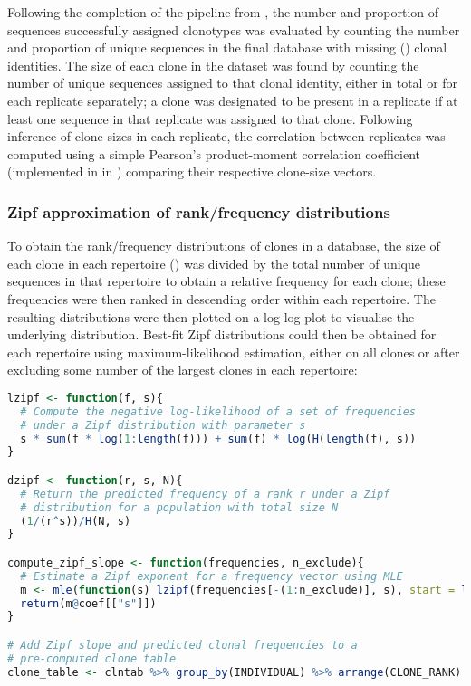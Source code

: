 Following the completion of the pipeline from , the number and proportion of sequences successfully assigned clonotypes was evaluated by counting the number and proportion of unique sequences in the final  database with missing () clonal identities. The size of each clone in the dataset was found by counting the number of unique sequences assigned to that clonal identity, either in total or for each replicate separately; a clone was designated to be present in a replicate if at least one sequence in that replicate was assigned to that clone. Following inference of clone sizes in each replicate, the correlation between replicates was computed using a simple Pearson's product-moment correlation coefficient (implemented in  in ) comparing their respective clone-size vectors.

\subsubsection{Zipf approximation of rank/frequency distributions}
\label{sec:methods_comp_igdownstream_zipf}

To obtain the rank/frequency distributions of clones in a  database, the size of each clone in each repertoire () was divided by the total number of unique sequences in that repertoire to obtain a relative frequency for each clone; these frequencies were then ranked in descending order within each repertoire. The resulting distributions were then plotted on a log-log plot to visualise the underlying distribution. Best-fit Zipf distributions could then be obtained for each repertoire using maximum-likelihood estimation, either on all clones or after excluding some number of the largest clones in each repertoire:

\begin{lstlisting}[language=R]
lzipf <- function(f, s){
  # Compute the negative log-likelihood of a set of frequencies
  # under a Zipf distribution with parameter s
  s * sum(f * log(1:length(f))) + sum(f) * log(H(length(f), s))
}

dzipf <- function(r, s, N){
  # Return the predicted frequency of a rank r under a Zipf 
  # distribution for a population with total size N
  (1/(r^s))/H(N, s)
}

compute_zipf_slope <- function(frequencies, n_exclude){
  # Estimate a Zipf exponent for a frequency vector using MLE
  m <- mle(function(s) lzipf(frequencies[-(1:n_exclude)], s), start = list(s=1))
  return(m@coef[["s"]])
}

# Add Zipf slope and predicted clonal frequencies to a
# pre-computed clone table
clone_table <- clntab %>% group_by(INDIVIDUAL) %>% arrange(CLONE_RANK) %>% mutate(S = compute_zipf_slope(CLONE_SIZE, n_exclude), EXP_FREQUENCY = dzipf(CLONE_RANK, S, n()), EXP_SIZE = sum(CLONE_SIZE) * EXP_FREQUENCY))
\end{lstlisting}

